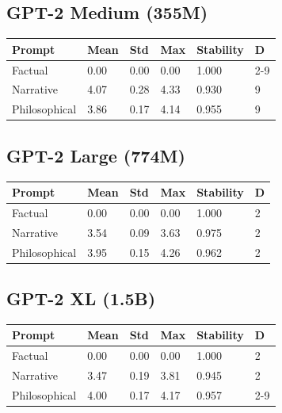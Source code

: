 \documentclass[12pt,a4paper]{article}
\begin{document}
\subsection{GPT-2 Medium (355M)}

\begin{table}[h]
\centering
\begin{tabular}{llllll}
\toprule
\textbf{Prompt} & \textbf{Mean} & \textbf{Std} & \textbf{Max} & \textbf{Stability} & \textbf{D} \\
\midrule
Factual & 0.00 & 0.00 & 0.00 & 1.000 & 2-9 \\
Narrative & 4.07 & 0.28 & 4.33 & 0.930 & 9 \\
Philosophical & 3.86 & 0.17 & 4.14 & 0.955 & 9 \\
\bottomrule
\end{tabular}
\end{table}

\subsection{GPT-2 Large (774M)}

\begin{table}[h]
\centering
\begin{tabular}{llllll}
\toprule
\textbf{Prompt} & \textbf{Mean} & \textbf{Std} & \textbf{Max} & \textbf{Stability} & \textbf{D} \\
\midrule
Factual & 0.00 & 0.00 & 0.00 & 1.000 & 2 \\
Narrative & 3.54 & 0.09 & 3.63 & 0.975 & 2 \\
Philosophical & 3.95 & 0.15 & 4.26 & 0.962 & 2 \\
\bottomrule
\end{tabular}
\end{table}

\subsection{GPT-2 XL (1.5B)}

\begin{table}[h]
\centering
\begin{tabular}{llllll}
\toprule
\textbf{Prompt} & \textbf{Mean} & \textbf{Std} & \textbf{Max} & \textbf{Stability} & \textbf{D} \\
\midrule
Factual & 0.00 & 0.00 & 0.00 & 1.000 & 2 \\
Narrative & 3.47 & 0.19 & 3.81 & 0.945 & 2 \\
Philosophical & 4.00 & 0.17 & 4.17 & 0.957 & 2-9 \\
\bottomrule
\end{tabular}
\end{table}
\end{document}

